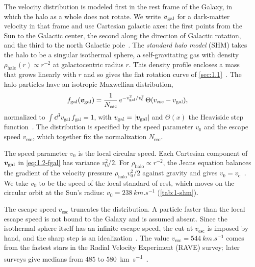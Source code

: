 The velocity distribution is modeled first in the rest frame of the Galaxy, in which the halo as a whole does not rotate. We write $\bm{v}_{\mathrm{gal}}$ for a dark-matter velocity in that frame and use Cartesian galactic axes: the first points from the Sun to the Galactic center, the second along the direction of Galactic rotation, and the third to the north Galactic pole~\cite[Sect.~5]{green2012astrophysical}. The \emph{standard halo model} (SHM) takes the halo to be a singular isothermal sphere, a self-gravitating gas with density $\rho_{\mathrm{halo}}(r) \propto r^{-2}$ at galactocentric radius $r$. This density profile encloses a mass that grows linearly with $r$ and so gives the flat rotation curve of \cref{sec:1.1}~\cite[Sect.~2.1]{green2012astrophysical}. The halo particles have an isotropic Maxwellian distribution,
\begin{equation}
  f_{\mathrm{gal}}(\bm{v}_{\mathrm{gal}}) = \frac{1}{N_{\mathrm{esc}}}\, \mathrm{e}^{-v_{\mathrm{gal}}^2/v_0^2}\, \Theta(v_{\mathrm{esc}} - v_{\mathrm{gal}}),
  \label{eq:1.2-fgal}
\end{equation}
normalized to $\int \dd^3 v_{\mathrm{gal}}\, f_{\mathrm{gal}} = 1$, with $v_{\mathrm{gal}} = |\bm{v}_{\mathrm{gal}}|$ and $\Theta(x)$ the Heaviside step function~\cite[Eq.~(10)]{baxter2021recommended}. The distribution is specified by the speed parameter $v_0$ and the escape speed $v_{\mathrm{esc}}$, which together fix the normalization $N_{\mathrm{esc}}$.

The speed parameter $v_0$ is the local circular speed. Each Cartesian component of $\bm{v}_{\mathrm{gal}}$ in \cref{eq:1.2-fgal} has variance $v_0^2/2$. For $\rho_{\mathrm{halo}} \propto r^{-2}$, the Jeans equation balances the gradient of the velocity pressure $\rho_{\mathrm{halo}} v_0^2/2$ against gravity and gives $v_0 = v_{\mathrm{c}}$~\cite[Eq.~(11)]{green2012astrophysical}. We take $v_0$ to be the speed of the local standard of rest, which moves on the circular orbit at the Sun's radius: $v_0 = \SI{238}{km.s^{-1}}$ (\cref{tab:1-shm}).

The escape speed $v_{\mathrm{esc}}$ truncates the distribution. A particle faster than the local escape speed is not bound to the Galaxy and is assumed absent. Since the isothermal sphere itself has an infinite escape speed, the cut at $v_{\mathrm{esc}}$ is imposed by hand, and the sharp step is an idealization~\cite[Sect.~2.1]{green2012astrophysical}. The value $v_{\mathrm{esc}} = \SI{544}{km.s^{-1}}$ comes from the fastest stars in the Radial Velocity Experiment (RAVE) survey; later surveys give medians from 485 to \SI{580}{km.s^{-1}}~\cite[Sect.~3.1.2 and Table~2]{baxter2021recommended}.

